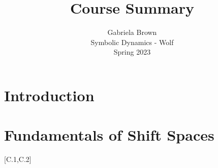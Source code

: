 \documentclass[11pt, reqno]{amsart}
\title{Course Summary}
\author{Gabriela Brown\\ Symbolic Dynamics - Wolf \\ Spring 2023}
\theoremstyle{plain}
\numberwithin{thm}{subsection}
\theoremstyle{definition}
\begin{document}
\maketitle

 {
  \setlength{\parskip}{4.4pt}   
  \tableofcontents
 }


\section{Introduction}




\newpage
\section{Fundamentals of Shift Spaces}
\cite{lind-marc}[C.1,C.2]






\end{document}
